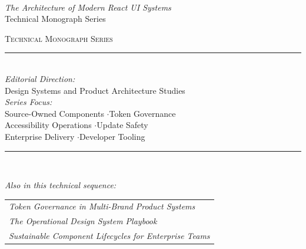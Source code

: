 \documentclass[11pt,twoside,a4paper]{article}
\begin{document}
\nopagecolor

\newpage
\thispagestyle{empty}
\vspace*{\fill}
\begin{center}
  \textcolor{oxfordblue}{}\\[12pt]
  {\Large\itshape\color{oxfordblue} The Architecture of Modern React UI Systems}\\[4pt]
  {\small\color{darkgray} Technical Monograph Series}
\end{center}
\vspace*{\fill}

\newpage
\thispagestyle{empty}
\vspace*{1.1cm}
\begin{center}
  {\small\scshape\color{oxfordblue} Technical Monograph Series}\\[0.3cm]
  \textcolor{goldaccent}{\rule{6cm}{0.6pt}}\\[0.5cm]
  {\footnotesize\color{darkgray}
    \textit{Editorial Direction:}\\[3pt]
    Design Systems and Product Architecture Studies\\[0.8cm]
    \textit{Series Focus:}\\[3pt]
    Source-Owned Components \enspace$\cdot$\enspace Token Governance\\
    Accessibility Operations \enspace$\cdot$\enspace Update Safety\\
    Enterprise Delivery \enspace$\cdot$\enspace Developer Tooling
  }\\[1cm]
  \textcolor{goldaccent}{\rule{6cm}{0.6pt}}\\[0.6cm]
  {\footnotesize\color{darkgray}
    \textit{Also in this technical sequence:}\\[4pt]
    \begin{tabular}{@{}l@{}}
    \textit{Token Governance in Multi-Brand Product Systems}\\
    \textit{The Operational Design System Playbook}\\
    \textit{Sustainable Component Lifecycles for Enterprise Teams}\\
    \end{tabular}
  }
\end{center}
\end{document}
